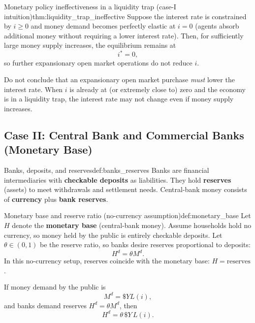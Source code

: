 \begin{theorem}{Monetary policy ineffectiveness in a liquidity trap (case-I intuition)}{thm:liquidity_trap_ineffective}
Suppose the interest rate is constrained by $i\ge 0$ and money demand becomes perfectly elastic at $i=0$ (agents absorb additional money without requiring a lower interest rate).
Then, for sufficiently large money supply increases, the equilibrium remains at
\[
i^\ast = 0,
\]
so further expansionary open market operations do not reduce $i$.
\end{theorem}

\begin{commonmistake}
Do not conclude that an expansionary open market purchase \emph{must} lower the interest rate.
When $i$ is already at (or extremely close to) zero and the economy is in a liquidity trap,
the interest rate may not change even if money supply increases.
\end{commonmistake}

\subsection{Case II: Central Bank and Commercial Banks (Monetary Base)}

\begin{definition}{Banks, deposits, and reserves}{def:banks_reserves}
Banks are financial intermediaries with \textbf{checkable deposits} as liabilities.
They hold \textbf{reserves} (assets) to meet withdrawals and settlement needs.
Central-bank money consists of \textbf{currency} plus \textbf{bank reserves}.
\end{definition}

\begin{definition}{Monetary base and reserve ratio (no-currency assumption)}{def:monetary_base}
Let $H$ denote the \textbf{monetary base} (central-bank money).
Assume households hold no currency, so money held by the public is entirely checkable deposits.
Let $\theta\in(0,1)$ be the reserve ratio, so banks desire reserves proportional to deposits:
\[
H^d = \theta M^d.
\]
In this no-currency setup, reserves coincide with the monetary base: $H=\text{reserves}$.
\end{definition}

\begin{keyformula}[title={Key Formula: Demand for monetary base (Case II)}]
If money demand by the public is
\[
M^d = \$Y L(i),
\]
and banks demand reserves $H^d=\theta M^d$, then
\[
H^d = \theta\,\$Y\,L(i).
\]
\end{keyformula}

